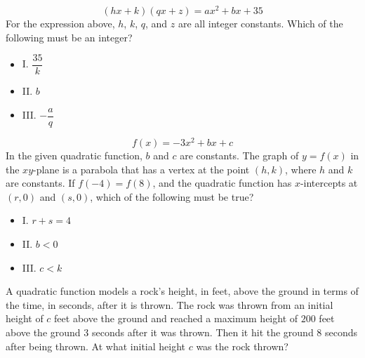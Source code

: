 \noindent\markforreview
\vspace{1em}

\[
(hx + k)(qx + z) = ax^{2} + bx + 35
\]
For the expression above, \(h\), \(k\), \(q\), and \(z\) are all integer constants. Which of the following must be an integer?

\begin{itemize}
\item I. \(\dfrac{35}{k}\)
\item II. \(b\)
\item III. \(-\dfrac{a}{q}\)
\end{itemize}

\vspace{0.75em}


\vspace{2em}
\newpage

\noindent\markforreview
\vspace{1em}

\[
f(x) = -3x^{2} + bx + c
\]
In the given quadratic function, \(b\) and \(c\) are constants. The graph of \(y = f(x)\) in the \(xy\)-plane is a parabola that has a vertex at the point \((h, k)\), where \(h\) and \(k\) are constants. If \(f(-4) = f(8)\), and the quadratic function has \(x\)-intercepts at \((r, 0)\) and \((s, 0)\), which of the following must be true?

\begin{itemize}
\item I. \(r + s = 4\)
\item II. \(b < 0\)
\item III. \(c < k\)
\end{itemize}

\vspace{0.75em}


\vspace{2em}
\newpage

\noindent\markforreview
\vspace{1em}

A quadratic function models a rock's height, in feet, above the ground in terms of the time, in seconds, after it is thrown. The rock was thrown from an initial height of \(c\) feet above the ground and reached a maximum height of \(200\) feet above the ground \(3\) seconds after it was thrown. Then it hit the ground \(8\) seconds after being thrown. At what initial height \(c\) was the rock thrown?

